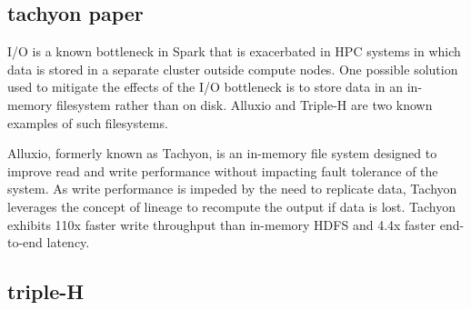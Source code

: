 \documentclass{report}
\begin{document}
	\subsection{tachyon paper}
	I/O is a known bottleneck in Spark that is exacerbated in HPC systems in which data is stored in a separate cluster outside compute nodes. One possible solution used to mitigate the effects of the I/O bottleneck is to store data in an in-memory filesystem rather than on disk. Alluxio and Triple-H are two known examples of such filesystems.
	
	Alluxio, formerly known as Tachyon, is an in-memory file system designed to improve read and write performance without impacting fault tolerance of the system. As write performance is impeded by the need to replicate data, Tachyon leverages the concept of lineage to recompute the output if data is lost. Tachyon exhibits 110x faster write throughput than in-memory HDFS and 4.4x faster end-to-end latency. 
	\subsection{triple-H}
	
	
	
	
	
	
	
	
	
	
	
	
	
	
	
	
	
	
\end{document}
